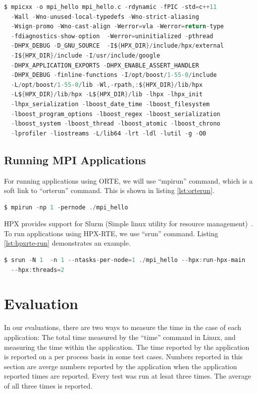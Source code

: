 \begin{lstlisting}[language=C, frame=single, basicstyle=\footnotesize, caption=Compile Line for Hello World\label{lst:compile}]
  $ mpicxx -o mpi_hello mpi_hello.c -rdynamic -fPIC -std=c++11
  -Wall -Wno-unused-local-typedefs -Wno-strict-aliasing
  -Wsign-promo -Wno-cast-align -Werror=vla -Werror=return-type
  -fdiagnostics-show-option  -Werror=uninitialized -pthread
  -DHPX_DEBUG -D_GNU_SOURCE  -I${HPX_DIR}/include/hpx/external
  -I${HPX_DIR}/include -I/usr/include/google
  -DHPX_APPLICATION_EXPORTS -DHPX_ENABLE_ASSERT_HANDLER
  -DHPX_DEBUG -finline-functions -I/opt/boost/1-55-0/include
  -L/opt/boost/1-55-0/lib -Wl,-rpath,:${HPX_DIR}/lib/hpx
  -L${HPX_DIR}/lib/hpx -L${HPX_DIR}/lib -lhpx -lhpx_init
  -lhpx_serialization -lboost_date_time -lboost_filesystem
  -lboost_program_options -lboost_regex -lboost_serialization
  -lboost_system -lboost_thread -lboost_atomic -lboost_chrono
  -lprofiler -liostreams -L/lib64 -lrt -ldl -lutil -g -O0
\end{lstlisting}

\clearpage
\subsection{Running MPI Applications}
For running applications using ORTE, we will use ``mpirun'' command, which is a soft link to ``orterun'' command. This is shown in listing \ref{lst:orterun}.

\begin{lstlisting}[language=C, frame=single, basicstyle=\footnotesize, caption=Running MPI Applications Using ORTE \label{lst:orterun}]
$ mpirun -np 1 -pernode ./mpi_hello
\end{lstlisting}

HPX provides support for Slurm (Simple linux utility for resource management)~\cite{yoo2003slurm}. To run applications using HPX-RTE, we use ``srun'' command. Listing \ref{lst:hpxrte-run} demonstrates an example.

\begin{lstlisting}[language=C, frame=single, basicstyle=\footnotesize, caption=Running MPI Applications Using HPX-RTE \label{lst:hpxrte-run}]
$ srun -N 1  -n 1 --ntasks-per-node=1 ./mpi_hello --hpx:run-hpx-main
  --hpx:threads=2
\end{lstlisting}


\section{Evaluation}
In our evaluations, there are two ways to measure the time in the case of each application: The total time measured by the ``time'' command in Linux, and measuring the time within the application. The time reported by the application is reported on a per process basis in some test cases. Numbers reported in this section are averge numbers reported by the application when the application reported times are reported. Every test was run at lesat three times. The average of all three times is reported.


